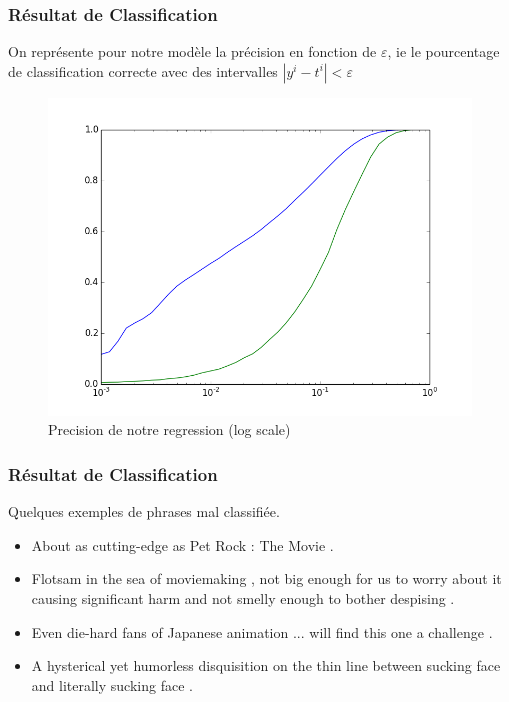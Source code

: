 \documentclass{beamer}
\begin{document}
\begin{frame}
\frametitle{Résultat de Classification}
On représente pour notre modèle la précision en fonction de $\varepsilon$, ie le pourcentage de classification correcte avec des intervalles $|y^i-t^i|<\varepsilon$
\begin{figure}[htp]
\centering
\includegraphics[scale=0.37]{fig/log_eps_curve.png}
\caption{Precision de notre regression (log scale)}
\end{figure}
\end{frame}



\begin{frame}
\frametitle{Résultat de Classification}
Quelques exemples de phrases mal classifiée.
\begin{itemize}\setlength{\itemsep}{5mm}
\item About as cutting-edge as Pet Rock : The Movie .
\item Flotsam in the sea of moviemaking , not big enough for us to worry about it causing significant harm and not smelly enough to bother despising .
\item Even die-hard fans of Japanese animation ... will find this one a challenge .
\item A hysterical yet humorless disquisition on the thin line between sucking face and literally sucking face .
\end{itemize}

\end{frame}


\end{document}
